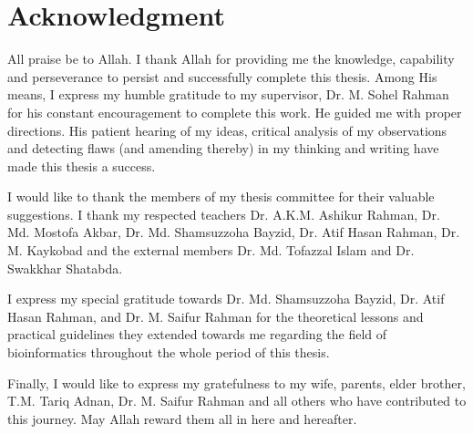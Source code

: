 \chapter*{Acknowledgment}

All praise be to Allah. I thank Allah for providing me the knowledge, capability and perseverance to persist and successfully complete this thesis. Among His means, I express my  humble gratitude to my supervisor, Dr. M. Sohel Rahman for his constant encouragement to complete this work. He guided me with proper directions. His patient hearing of my ideas, critical analysis of my observations and detecting flaws (and amending thereby) in my thinking and writing have made this thesis a success.

I would like to thank the members of my thesis committee for their valuable suggestions. I thank my respected teachers Dr. A.K.M. Ashikur Rahman, Dr. Md. Mostofa Akbar, Dr. Md. Shamsuzzoha Bayzid, Dr. Atif Hasan Rahman, Dr. M. Kaykobad and the external members Dr. Md. Tofazzal Islam and Dr. Swakkhar Shatabda.

I express my special gratitude towards Dr. Md. Shamsuzzoha Bayzid, Dr. Atif Hasan Rahman, and Dr. M. Saifur Rahman for the theoretical lessons and practical guidelines they extended towards me regarding the field of bioinformatics throughout the whole period of this thesis.  

Finally, I would like to express my gratefulness to my wife, parents, elder brother, T.M. Tariq Adnan, Dr. M. Saifur Rahman and all others who have contributed to this journey. May Allah reward them all in here and hereafter.